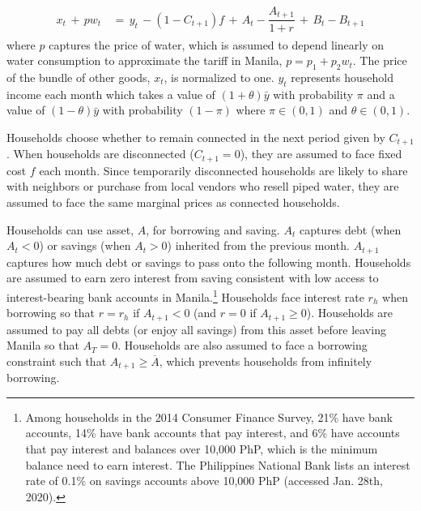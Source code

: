 \documentclass[12pt]{article}
\begin{document}
\begin{align}\label{eq:bc}
\begin{split}
x_t \, + \, p w_t \, &= \, y_t \, - (1-C_{t+1})f  \, + \,  A_t  - \dfrac{A_{t+1}}{1+r}   \, + \,  B_t - B_{t+1} 
\end{split}
\end{align}
where $p$ captures the price of water, which is assumed to depend linearly on water consumption to approximate the tariff in Manila, $p=p_1+p_2w_t$.   The price of the bundle of other goods, $x_t$, is normalized to one.  $y_t$ represents household income each month which takes a value of $(1+\theta)\bar{y}$ with probability $\pi$ and a value of $(1-\theta)\bar{y}$ with probability $(1-\pi)$ where $\pi \in (0,1)$ and $\theta  \in (0,1)$.  

Households choose whether to remain connected in the next period given by $C_{t+1}$.  When households are disconnected ($C_{t+1}=0$), they are assumed to face fixed cost $f$ each month.  Since temporarily disconnected households are likely to share with neighbors or purchase from local vendors who resell piped water, they are assumed to face the same marginal prices as connected households.

Households can use asset, $A$, for borrowing and saving.  $A_t$ captures debt (when $A_t<0$) or savings (when $A_t>0$) inherited from the previous month.  $A_{t+1}$ captures how much debt or savings to pass onto the following month.  Households are assumed to earn zero interest from saving consistent with low access to interest-bearing bank accounts in Manila.\footnote{Among households in the 2014 Consumer Finance Survey, 21\% have bank accounts, 14\% have bank accounts that pay interest, and 6\% have accounts that pay interest and balances over 10,000 PhP, which is the minimum balance need to earn interest.  The Philippines National Bank lists an interest rate of 0.1\% on savings accounts above 10,000 PhP (accessed Jan. 28th, 2020).} Households face interest rate $r_h$ when borrowing so that  $r=r_h$ if $A_{t+1}<0$ (and $r = 0$ if $A_{t+1}\geq 0$).  Households are assumed to pay all debts (or enjoy all savings) from this asset before leaving Manila so that $A_{T}=0$.  Households are also assumed to face a borrowing constraint such that $A_{t+1}\geq\overline{A}$, which prevents households from infinitely borrowing.
\end{document}
